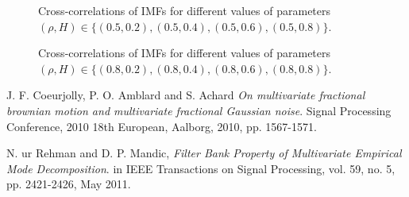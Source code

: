 \documentclass[oneside,11pt]{paper}
\begin{document}
\begin{figure}[htbp]
  \hspace{-2cm}
 \caption{Cross-correlations of IMFs for different values of parameters $(\rho, H) \in \{(0.5,0.2), (0.5,0.4), (0.5,0.6), (0.5,0.8)\}$.}
  \label{Fig:Corelation5}
\end{figure}


\begin{figure}[htbp]
  \hspace{-2cm}
 \caption{Cross-correlations of IMFs for different values of parameters $(\rho, H) \in \{(0.8,0.2), (0.8,0.4), (0.8,0.6), (0.8,0.8)\}$.}
  \label{Fig:Corelation8}
\end{figure}




\begin{thebibliography}{9}
J. F. Coeurjolly, P. O. Amblard and S. Achard 
\textit{On multivariate fractional brownian motion and multivariate fractional Gaussian noise}. 
 Signal Processing Conference, 2010 18th European, Aalborg, 2010, pp. 1567-1571.

N. ur Rehman and D. P. Mandic, 
\textit{Filter Bank Property of Multivariate Empirical Mode Decomposition}. 
 in IEEE Transactions on Signal Processing, vol. 59, no. 5, pp. 2421-2426, May 2011.

\end{thebibliography}
\end{document}
